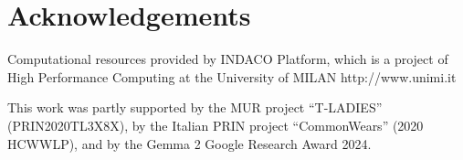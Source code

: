 \section*{Acknowledgements}
    
\begin{itemize*}
    \item Computational resources provided by INDACO Platform, which is a project of High Performance Computing at the University of MILAN http://www.unimi.it
    \item This work was partly supported by the MUR project “T-LADIES” (PRIN2020TL3X8X), by the Italian PRIN project ``CommonWears'' (2020 HCWWLP), and by the Gemma 2 Google Research Award 2024.
\end{itemize*}
